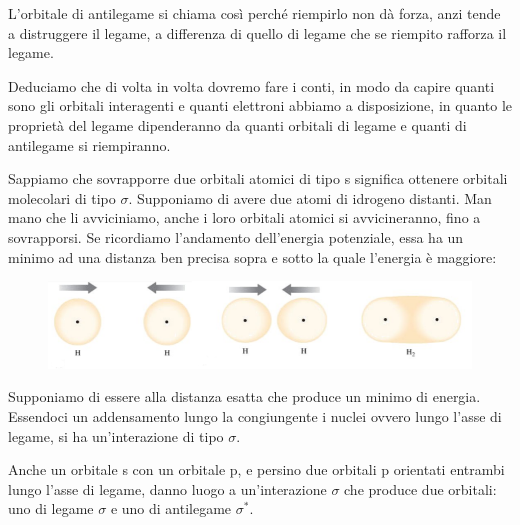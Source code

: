 L'orbitale di antilegame si chiama così perché riempirlo non dà forza, anzi tende a distruggere il legame, a differenza di quello di legame che se riempito rafforza il legame.

Deduciamo che di volta in volta dovremo fare i conti, in modo da capire quanti sono gli orbitali interagenti e quanti elettroni abbiamo a disposizione, in quanto le proprietà del legame dipenderanno da quanti orbitali di legame e quanti di antilegame si riempiranno.

\vspace{0.2cm}Sappiamo che sovrapporre due orbitali atomici di tipo s significa ottenere orbitali molecolari di tipo $\sigma$. Supponiamo di avere due atomi di idrogeno distanti. Man mano che li avviciniamo, anche i loro orbitali atomici si avvicineranno, fino a sovrapporsi. Se ricordiamo l'andamento dell'energia potenziale, essa ha un minimo ad una distanza ben precisa sopra e sotto la quale l'energia è maggiore:

\begin{figure}[htp]
    \centering
    \includegraphics[width=12cm]{immagini/avvicinamento_orbitali.png}
\end{figure}

Supponiamo di essere alla distanza esatta che produce un minimo di energia. Essendoci un addensamento lungo la congiungente i nuclei ovvero lungo l'asse di legame, si ha un'interazione di tipo $\sigma$.

\vspace{0.2cm}Anche un orbitale s con un orbitale p, e persino due orbitali p orientati entrambi lungo l'asse di legame, danno luogo a un'interazione $\sigma$ che produce due orbitali: uno di legame  $\sigma$ e uno di antilegame  $\sigma^*$.

